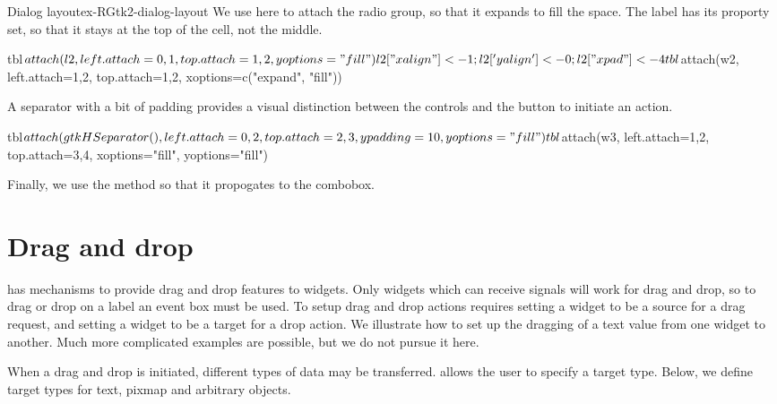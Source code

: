 \begin{example}{Dialog layout}{ex-RGtk2-dialog-layout}
We use  here to attach the radio group, so that it
expands to fill the space. The label has its  proporty
set, so that it stays at the top of the cell, not the middle.
\begin{Schunk}
\begin{Sinput}
 tbl$attach(l2, left.attach=0,1, top.attach=1,2, yoptions="fill")
 l2["xalign"] <- 1; l2['yalign'] <- 0; l2["xpad"] <- 4
 tbl$attach(w2, left.attach=1,2, top.attach=1,2, xoptions=c("expand", "fill"))
\end{Sinput}
\end{Schunk}
A separator with a bit of padding provides a visual distinction
between the controls and the button to initiate an action.
\begin{Schunk}
\begin{Sinput}
 tbl$attach(gtkHSeparator(),left.attach=0,2, top.attach=2,3, ypadding=10, yoptions="fill")
 tbl$attach(w3, left.attach=1,2, top.attach=3,4, xoptions="fill", yoptions="fill")
\end{Sinput}
\end{Schunk}
Finally, we use the  method so that it propogates to the combobox.
\begin{Schunk}
\end{Schunk}
\end{example}




\section{Drag and drop}
\label{sec:RGtk2:dnd}


\GTK\/ has mechanisms to provide drag and drop features to
widgets. Only widgets which can receive signals will work for drag and
drop, so to drag or drop on a label an event box must be used. To
setup drag and drop actions requires setting a widget to be a source
for a drag request, and setting a widget to be a target for a drop
action. We illustrate how to set up the dragging of a text value from
one widget to another. Much more complicated examples are possible,
but we do not pursue it here.

When a drag and drop is initiated, different types of data may be
transferred. \GTK\/ allows the user to specify a target type. Below,
we define target types for text, pixmap and arbitrary objects.

